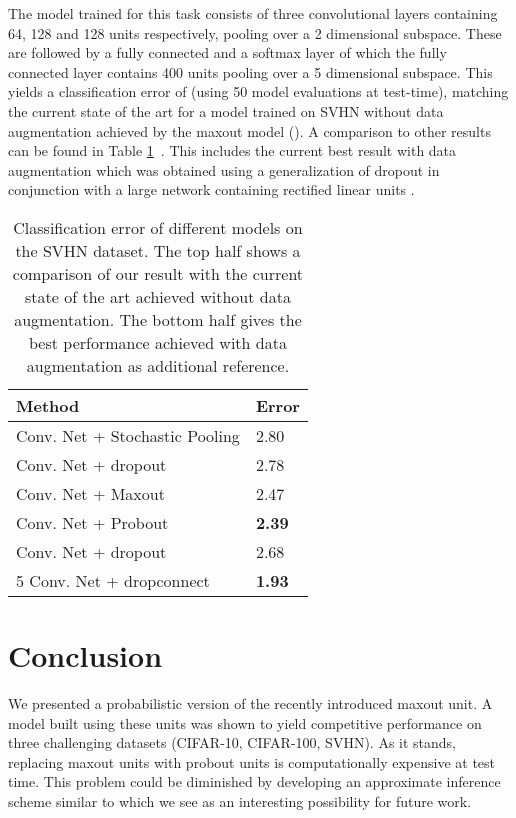 \documentclass{article} \pdfoutput=1
\begin{document}
The model trained for this task consists of three convolutional layers
containing 64, 128 and 128 units respectively, pooling over a 2
dimensional subspace. These are followed by a fully connected and a
softmax layer of which the fully connected layer contains 400 units
pooling over a 5 dimensional subspace. 
This yields a classification
error of  (using 50 model evaluations at test-time), matching
the current state of the art for a model trained on SVHN without data
augmentation achieved by the maxout model (). A
comparison to other results can be found in Table
\ref{svhn_results}~. This includes the current best result 
with data augmentation which was obtained using a generalization of
dropout in conjunction with a large network containing rectified
linear units \cite{WanLi2013}.


\begin{table}[h]
\vspace{-0.1cm}
\caption{Classification error of different models on the
  SVHN dataset. The top half shows a comparison of our result with the
  current state of the art achieved without data
  augmentation. The bottom half gives the best performance achieved
  with data augmentation as additional reference.}
\begin{center}
\begin{small}
\begin{sc}
\begin{tabular}{l|l}
Method  & Error \\
\hline
Conv. Net + Stochastic Pooling \cite{ZeilerStochastic2013} & 2.80  \\
Conv. Net + dropout \cite{Nitish2013Mas} & 2.78  \\
Conv. Net + Maxout \cite{Goodfellow2013}  & 2.47  \\
Conv. Net + Probout  & \textbf{2.39 } \\
\hline
Conv. Net + dropout \cite{Nitish2013Mas} & 2.68   \\
5  Conv. Net + dropconnect \cite{WanLi2013} & \textbf{1.93 }  \\
\hline
\end{tabular}
\end{sc}
\end{small}
\end{center}
\vskip -0.1in
\label{svhn_results}
\end{table}

\section{Conclusion}
We presented a probabilistic version of the recently introduced maxout
unit. A model built using these units was shown to yield competitive
performance on three challenging datasets (CIFAR-10, CIFAR-100,
SVHN). As it stands, replacing maxout units with probout units is
computationally expensive at test time. This problem could be
diminished by developing an approximate inference scheme similar to
\cite{Krizhevsky2012, Zeiler2013} which we see as an interesting
possibility for future work. 
\end{document}
